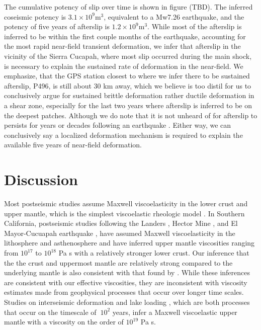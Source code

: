 \documentclass[1p]{elsarticle}
\begin{document}
The cumulative potency of slip over time is shown in figure (TBD). The inferred coseismic potency is $3.1\times10^{9} \mathrm{m}^3$, equivalent to a Mw7.26 earthquake, and the potency of five years of afterslip is $1.2\times10^{9} \mathrm{m}^3$.  While most of the afterslip is inferred to be within the first couple months of the earthquake, accounting for the most rapid near-field transient deformation, we infer that afterslip in the vicinity of the Sierra Cucapah, where most slip occurred during the main shock, is necessary to explain the sustained rate of deformation in the near-field.  We emphasize, that the GPS station closest to where we infer there to be sustained afterslip, P496, is still about 30 km away, which we believe is too distil for us to conclusively argue for sustained brittle deformation rather ductile deformation in a shear zone, especially for the last two years where afterslip is inferred to be on the deepest patches.    Although we do note that it is not unheard of for afterslip to persists for years or decades following an earthquake \citep{Cakir2012}.  Either way, we can conclusively say a localized deformation mechanism is required to explain the available five years of near-field deformation.             
  
\section{Discussion}

Most postseismic studies assume Maxwell viscoelasticity in the lower crust and upper mantle, which is the simplest viscoelastic rheologic model \citep[e.g.][]{Nur1974,Pollitz2000,Hetland2003,Freed2006a,Johnson2009,Hearn2009}.  In Southern California, postseismic studies following the Landers \citep{Pollitz2000}, Hector Mine \citep{Pollitz2001}, and El Mayor-Cucuapah earthquake \citep{Spinler2015,Rollins2015}, have assumed Maxwell viscoelasticity in the lithosphere and asthenosphere and have inferred upper mantle viscosities ranging from $10^{17}$ to $10^{18}$ Pa s with a relatively stronger lower crust. Our inference that the the crust and uppermost mantle are relatively strong compared to the underlying mantle is also consistent with that found by \citet{Freed2007a}.  While these inferences are consistent with our effective viscosities, they are inconsistent with viscosity estimates made from geophysical processes that occur over longer time scales. Studies on interseismic deformation \citep{Lundgren2009} and lake loading \citep{Luttrell2007}, which are both processes that occur on the timescale of $~10^2$ years, infer a Maxwell viscoelastic upper mantle with a viscosity on the order of $10^{19}$ Pa s. 
\end{document}
